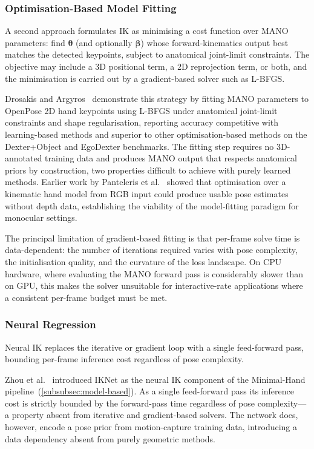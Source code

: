 \subsubsection{Optimisation-Based Model Fitting}\label{subsubsec:sota_ik_optim}

A second approach formulates IK as minimising a cost function over MANO
parameters: find $\boldsymbol{\theta}$ (and optionally
$\boldsymbol{\beta}$) whose forward-kinematics output best matches the
detected keypoints, subject to anatomical joint-limit constraints.
The objective may include a 3D positional term, a 2D reprojection term,
or both, and the minimisation is carried out by a gradient-based solver
such as L-BFGS.

Drosakis and Argyros~\cite{drosakis2023mano} demonstrate this strategy
by fitting MANO parameters to OpenPose 2D hand keypoints using L-BFGS
under anatomical joint-limit constraints and shape regularisation,
reporting accuracy competitive with learning-based methods and superior
to other optimisation-based methods on the Dexter+Object and EgoDexter
benchmarks.
The fitting step requires no 3D-annotated training data and produces
MANO output that respects anatomical priors by construction, two properties
difficult to achieve with purely learned methods.
Earlier work by Panteleris et al.~\cite{panteleris2018backrgb} showed
that optimisation over a kinematic hand model from RGB input could
produce usable pose estimates without depth data, establishing
the viability of the model-fitting paradigm for monocular settings.

The principal limitation of gradient-based fitting is that per-frame
solve time is data-dependent: the number of iterations required varies
with pose complexity, the initialisation quality, and the curvature of
the loss landscape.
On CPU hardware, where evaluating the MANO forward pass is
considerably slower than on GPU, this makes the solver unsuitable for
interactive-rate applications where a consistent per-frame budget must
be met.



\subsubsection{Neural Regression}\label{subsubsec:sota_ik_neural}

Neural IK replaces the iterative or gradient loop with a single
feed-forward pass, bounding per-frame inference cost regardless of pose
complexity.

Zhou et al.~\cite{zhou2020monocular} introduced IKNet as the neural IK
component of the Minimal-Hand pipeline~(\autoref{subsubsec:model-based}).
As a single feed-forward pass its inference cost is strictly bounded by
the forward-pass time regardless of pose complexity---a property absent
from iterative and gradient-based solvers.
The network does, however, encode a pose prior from motion-capture training
data, introducing a data dependency absent from purely geometric methods.

